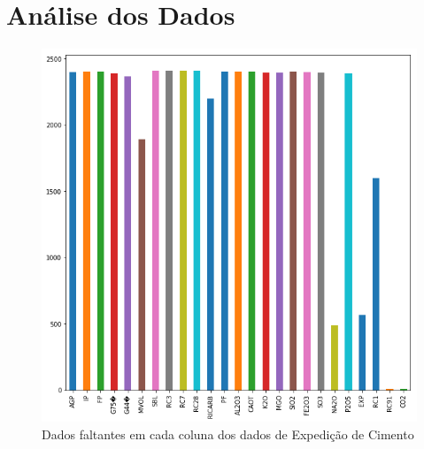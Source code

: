 \documentclass{beamer}
\begin{document}
\section{Análise dos Dados}

\begin{frame}
\begin{figure}[H]
\centering
\includegraphics[scale=0.3]{slides_dados_faltando}
\caption{Dados faltantes em cada coluna dos dados de Expedição de Cimento}
\end{figure}

\end{frame}
\end{document}
